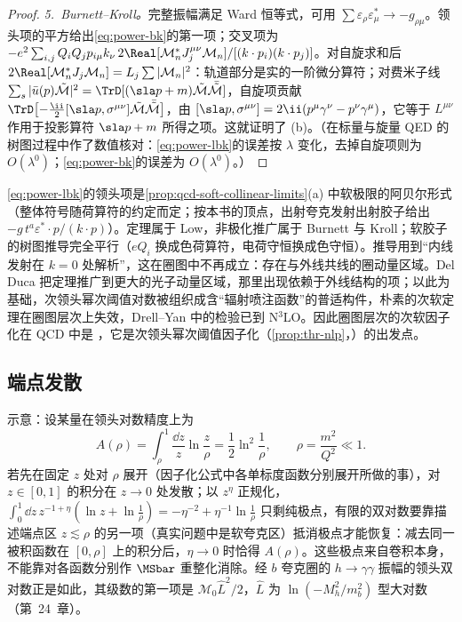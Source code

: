 \begin{proof}
\emph{5.~Burnett--Kroll。}完整振幅满足 Ward 恒等式，可用 $\sum\varepsilon_\rho\varepsilon^*_\mu\to-g_{\rho\mu}$。领头项的平方给出\eqref{eq:power-bk}的第一项；交叉项为 $-e^2\sum_{i,j}Q_iQ_jp_{i\mu}k_\nu\,2\Real[\mathcal M_n^*J_j^{\mu\nu}\mathcal M_n]/[(k\cdot p_i)(k\cdot p_j)]$。对自旋求和后 $2\Real[\mathcal M_n^*J_j\mathcal M_n]=L_j\sum|\mathcal M_n|^2$：轨道部分是实的一阶微分算符；对费米子线 $\sum_s|\bar u(p)\tilde{\mathcal M}|^2=\TrD[(\sla p+m)\tilde{\mathcal M}\bar{\tilde{\mathcal M}}]$，自旋项贡献 $\TrD\big[{-\frac{\ii}{2}}[\sla p,\sigma^{\mu\nu}]\tilde{\mathcal M}\bar{\tilde{\mathcal M}}\big]$，由 $[\sla p,\sigma^{\mu\nu}]=2\ii(p^\mu\gamma^\nu-p^\nu\gamma^\mu)$，它等于 $L^{\mu\nu}$ 作用于投影算符 $\sla p+m$ 所得之项。这就证明了 (b)。（在标量与旋量 QED 的树图过程中作了数值核对：\eqref{eq:power-lbk}的误差按 $\lambda$ 变化，去掉自旋项则为 $O(\lambda^0)$；\eqref{eq:power-bk}的误差为 $O(\lambda^0)$。）
\end{proof}

\eqref{eq:power-lbk}的领头项是\cref{prop:qcd-soft-collinear-limits}(a) 中软极限的阿贝尔形式（整体符号随荷算符的约定而定；按本书的顶点，出射夸克发射出射胶子给出 $-g\,t^a\varepsilon^*\!\cdot p/(k\cdot p)$）。定理属于 Low\cite{Low1958}，非极化推广属于 Burnett 与 Kroll\cite{BurnettKroll1968}；软胶子的树图推导完全平行（$eQ_i$ 换成色荷算符，电荷守恒换成色守恒）。推导用到“内线发射在 $k=0$ 处解析”，这在圈图中不再成立：存在与外线共线的圈动量区域。Del Duca 把定理推广到更大的光子动量区域，那里出现依赖于外线结构的项\cite{DelDuca1990}；以此为基础，次领头幂次阈值对数被组织成含“辐射喷注函数”的普适构件，朴素的次软定理在圈图层次上失效\cite{Bonocore:2015esa,Bonocore:2016awd}，Drell--Yan 中的检验已到 N$^3$LO\cite{Bahjat-Abbas:2018hpv}。因此圈图层次的次软因子化在 QCD 中是 \tagA，它是次领头幂次阈值因子化（\cref{prop:thr-nlp}，\tagP）的出发点。

\subsection{端点发散}

示意：设某量在领头对数精度上为
\begin{equation}\label{eq:power-endpoint-toy}
A(\rho)=\int_\rho^1\frac{\dd z}{z}\ln\frac{z}{\rho}=\frac12\ln^2\frac1\rho,\qquad\rho=\frac{m^2}{Q^2}\ll1 .
\end{equation}
若先在固定 $z$ 处对 $\rho$ 展开（因子化公式中各单标度函数分别展开所做的事），对 $z\in[0,1]$ 的积分在 $z\to0$ 处发散；以 $z^\eta$ 正规化，$\int_0^1\dd z\,z^{-1+\eta}(\ln z+\ln\frac1\rho)=-\eta^{-2}+\eta^{-1}\ln\frac1\rho$ 只剩纯极点，有限的双对数要靠描述端点区 $z\lesssim\rho$ 的另一项（真实问题中是软夸克区）抵消极点才能恢复：减去同一被积函数在 $[0,\rho]$ 上的积分后，$\eta\to0$ 时恰得 $A(\rho)$。这些极点来自卷积本身，不能靠对各函数分别作 $\MSbar$ 重整化消除。经 $b$ 夸克圈的 $h\to\gamma\gamma$ 振幅的领头双对数正是如此，其级数的第一项是 $\mathcal M_0\hat L^2/2$，$\hat L$ 为 $\ln(-M_h^2/m_b^2)$ 型大对数（第~24~章）。%

